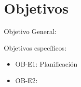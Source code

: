
\chapter{Objetivos} %
\label{cha:Objetivos}

    Objetivo General:

    Objetivos específicos:
    \begin{itemize}
        \item OB-E1: Planificación
        \item OB-E2:
    \end{itemize}

